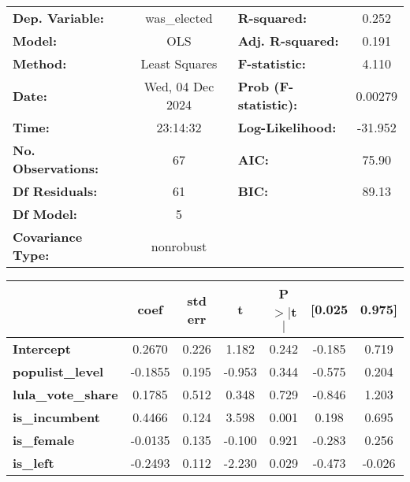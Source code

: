 \begin{center}
\begin{tabular}{lclc}
\toprule
\textbf{Dep. Variable:}    &   was\_elected   & \textbf{  R-squared:         } &     0.252   \\
\textbf{Model:}            &       OLS        & \textbf{  Adj. R-squared:    } &     0.191   \\
\textbf{Method:}           &  Least Squares   & \textbf{  F-statistic:       } &     4.110   \\
\textbf{Date:}             & Wed, 04 Dec 2024 & \textbf{  Prob (F-statistic):} &  0.00279    \\
\textbf{Time:}             &     23:14:32     & \textbf{  Log-Likelihood:    } &   -31.952   \\
\textbf{No. Observations:} &          67      & \textbf{  AIC:               } &     75.90   \\
\textbf{Df Residuals:}     &          61      & \textbf{  BIC:               } &     89.13   \\
\textbf{Df Model:}         &           5      & \textbf{                     } &             \\
\textbf{Covariance Type:}  &    nonrobust     & \textbf{                     } &             \\
\bottomrule
\end{tabular}
\begin{tabular}{lcccccc}
                           & \textbf{coef} & \textbf{std err} & \textbf{t} & \textbf{P$> |$t$|$} & \textbf{[0.025} & \textbf{0.975]}  \\
\midrule
\textbf{Intercept}         &       0.2670  &        0.226     &     1.182  &         0.242        &       -0.185    &        0.719     \\
\textbf{populist\_level}   &      -0.1855  &        0.195     &    -0.953  &         0.344        &       -0.575    &        0.204     \\
\textbf{lula\_vote\_share} &       0.1785  &        0.512     &     0.348  &         0.729        &       -0.846    &        1.203     \\
\textbf{is\_incumbent}     &       0.4466  &        0.124     &     3.598  &         0.001        &        0.198    &        0.695     \\
\textbf{is\_female}        &      -0.0135  &        0.135     &    -0.100  &         0.921        &       -0.283    &        0.256     \\
\textbf{is\_left}          &      -0.2493  &        0.112     &    -2.230  &         0.029        &       -0.473    &       -0.026     \\

\end{tabular}
\end{center}
